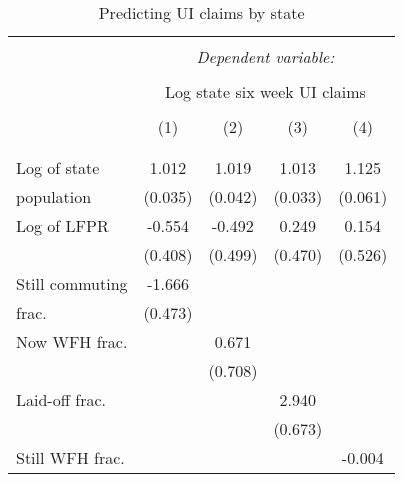 \begin{table}[!htbp] \centering                    \caption{Predicting UI claims by state}                    \label{tab:ui}                  \small                  \begin{tabular}{@{\extracolsep{5pt}}lcccc}                  \\[-1.8ex]\hline                  \hline \\[-1.8ex]                   & \multicolumn{4}{c}{\textit{Dependent variable:}} \\                  \cline{2-5}                  \\[-1.8ex] & \multicolumn{4}{c}{Log state six week UI claims} \\                  \\[-1.8ex] & (1) & (2) & (3) & (4)\\                  \hline \\[-1.8ex]               
 \\
[1em]
Log of state        &       1.012\sym{***}&       1.019\sym{***}&       1.013\sym{***}&       1.125\sym{***}\\
population          &     (0.035)         &     (0.042)         &     (0.033)         &     (0.061)         \\
[1em]
Log of LFPR         &      -0.554         &      -0.492         &       0.249         &       0.154         \\
                    &     (0.408)         &     (0.499)         &     (0.470)         &     (0.526)         \\
[1em]
Still commuting     &      -1.666\sym{***}&                     &                     &                     \\
frac.         &     (0.473)         &                     &                     &                     \\
[1em]
Now WFH frac. &                     &       0.671         &                     &                     \\
                    &                     &     (0.708)         &                     &                     \\
[1em]
Laid-off frac. &                     &                     &       2.940\sym{***}&                     \\
                    &                     &                     &     (0.673)         &                     \\
[1em]
Still WFH frac.     &                     &                     &                     &      -0.004\sym{**} \\

\end{tabular}
\end{table}
